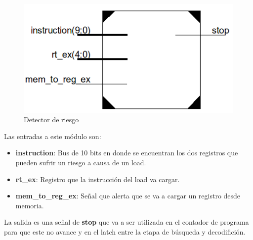 \begin{figure}[H]
\centering
\includegraphics[scale=0.35]{img/data_hazard}
\caption{Detector de riesgo}
\label{fig:datahazard}
\end{figure}  

Las entradas a este m\'odulo son:
\begin{itemize}
  \item \textbf{instruction}: Bus de 10 bits en donde se encuentran los dos registros que pueden sufrir un riesgo a causa de un load.
  \item \textbf{rt\_ex}: Registro que la instrucci\'on del load va cargar.
  \item \textbf{mem\_to\_reg\_ex}: Señal que alerta que se va a cargar un registro desde memoria. 
\end{itemize}

La salida es una señal de \textbf{stop} que va a ser utilizada en el contador de programa para que este no avance y en el latch entre la etapa de b\'usqueda y decodifici\'on. 